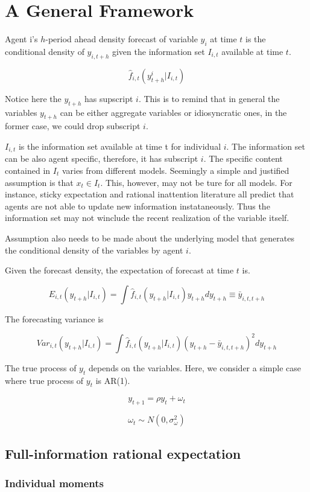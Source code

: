 \documentclass[]{article}
\begin{document}
\section{A General Framework}

Agent i's $h$-period ahead density forecast of variable $y_i$ at time $t$ is the conditional density of $y_{i,t+h}$ given the information set $I_{i,t}$ available at time $t$. 

$$\widehat f_{i,t}(y^i_{t+h}|I_{i,t})$$

Notice here the $y_{t+h}$ has supscript $i$. This is to remind that in general the variables $y_{t+h}$ can be either aggregate variables or idiosyncratic ones, in the former case, we could drop subscript $i$.  

$I_{i,t}$ is the information set available at time t for individual $i$. The information set can be also agent specific, therefore, it has subscript $i$.  The specific content contained in $I_t$ varies from different models. Seemingly a simple and justified assumption is that $x_t \in  I_t$. This, however, may not be ture for all models. For instance, sticky expectation and rational inattention literature all predict that agents are not able to update new information instataneously. Thus the information set may not winclude the recent realization of the variable itself.  

Assumption also needs to be made about the underlying model that generates the conditional density of the variables by agent $i$. 

Given the forecast density, the expectation of forecast at time $t$ is. 

$$E_{i,t}(y_{t+h}|I_{i,t}) =\int \widehat f_{i,t}(y_{t+h}|I_{i,t})y_{t+h} d y_{t+h}\equiv \bar y_{i,t,t+h}$$

The forecasting variance is 

$$Var_{i,t}(y_{t+h}|I_{i,t})=\int \widehat f_{i,t}(y_{t+h}|I_{i,t}) (y_{t+h} - \bar y_{i,t,t+h})^2d y_{t+h}$$

The true process of $y_{t}$ depends on the variables. Here, we consider a simple case where true process of $y_t$ is AR(1). 

$$y_{t+1} = \rho y_t + \omega_t$$

$$\omega_t \sim N(0,\sigma^2_{\omega})$$

\subsection{Full-information rational expectation}
\subsubsection{Individual moments}
\end{document}
